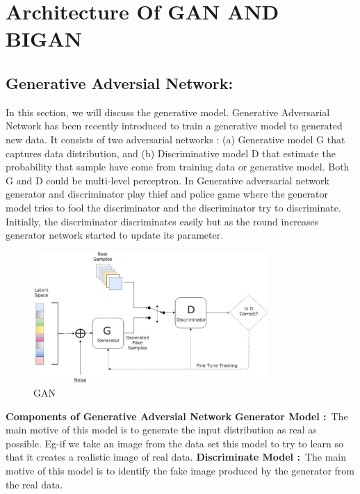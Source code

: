 \documentclass[runningheads]{llncs}
\begin{document}
\section{Architecture Of GAN AND BIGAN}
{\subsection{Generative Adversial Network: }
In this section, we will discuss the generative model. Generative Adversarial Network has been recently introduced to train a generative model to generated new data. It consists of two adversarial networks : (a) Generative model G that captures data distribution, and (b) Discriminative model D that estimate the probability that sample have come from training data or generative model. Both G and D could be multi-level perceptron. In Generative adversarial network generator and discriminator play thief and police game where the generator model tries to fool the discriminator and the discriminator try to discriminate. Initially, the discriminator discriminates easily but as the round increases generator network started to update its parameter.
\\
\begin{figure}[h]
\centering

\includegraphics[width=3.5in]{GAN.png}

\caption{GAN}
\label{LP}
\end{figure}

\hfill \break
\textbf{Components of Generative Adversial Network}
\hfill \break
\textbf{Generator Model :}~The main motive of this model is to generate the input distribution as real as possible. Eg-if we take an image from the data set this model to try to learn so that it creates a realistic image of real data.
\hfill \break
\newline
\textbf{Discriminate Model :}~The main motive of this model is to identify the fake image produced by the generator from the real data.
\newline
\hfill \break
}
\end{document}
